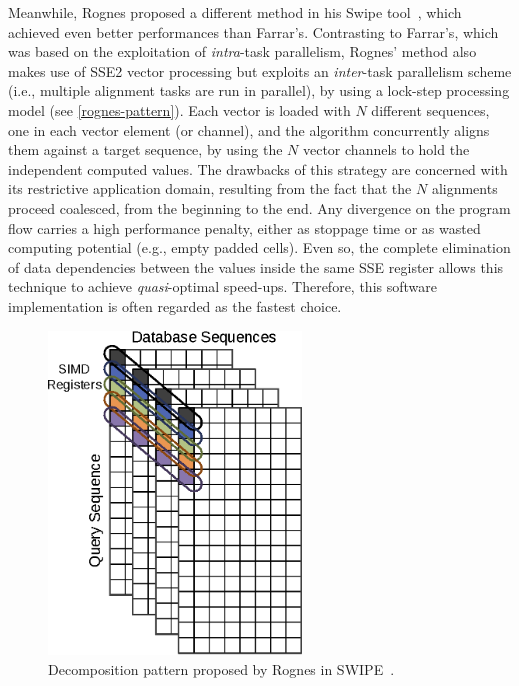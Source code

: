 \documentclass{bmcart}
\begin{document}
Meanwhile, Rognes proposed a different method in his Swipe tool~\cite{rognes}, which achieved even better performances than Farrar's. Contrasting to Farrar's, which was based on the exploitation of \textit{intra}-task parallelism, Rognes' method also makes use of SSE2 vector processing but exploits an \textit{inter}-task parallelism scheme (i.e., multiple alignment tasks are run in parallel), by using a lock-step processing
model (see \autoref{rognes-pattern}). Each vector is loaded with $N$ different sequences, one in each vector element (or channel), and the algorithm concurrently aligns them against a target sequence, by using the $N$ vector channels to hold the independent computed values. The drawbacks of this strategy are concerned with its restrictive application domain, resulting from the fact that the $N$ alignments proceed coalesced, from the beginning to the end. Any divergence on the program flow carries a high performance penalty, either as stoppage time or as wasted computing potential (e.g., empty padded cells). Even so, the complete elimination of data dependencies between the values inside the same SSE register allows this technique to achieve \textit{quasi}-optimal speed-ups. Therefore, this software implementation is often regarded as the fastest choice.

\begin{figure}[h!]
  \centering
  \includegraphics[width=0.6\textwidth]{img/rognes-pattern.eps}
  \caption{Decomposition pattern proposed by Rognes in SWIPE~\cite{rognes}.}
  \label{rognes-pattern}
\end{figure}
\end{document}

